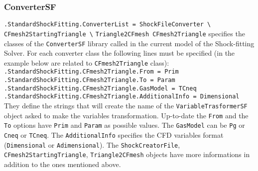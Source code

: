 \documentclass[11pt,a4paper,oneside]{article}
\begin{document}
\subsubsection*{ConverterSF}

\hspace*{1cm} \texttt{.StandardShockFitting.ConverterList = ShockFileConverter \textbackslash{}}
\newline
\hspace*{8.6cm} \texttt{CFmesh2StartingTriangle \textbackslash{}}
\newline
\hspace*{8.6cm} \texttt{Triangle2CFmesh CFmesh2Triangle}
\newline
\newline
specifies the classes of the \texttt{ConverterSF} library called in the current model of the Shock-fitting Solver. For each converter class the following lines must be specified (in the example below are related to \texttt{CFmesh2Triangle} class):
\newline
\newline
\hspace*{1cm} \texttt{.StandardShockFitting.CFmesh2Triangle.From = Prim}
\newline
\hspace*{1cm} \texttt{.StandardShockFitting.CFmesh2Triangle.To = Param}
\newline
\hspace*{1cm} \texttt{.StandardShockFitting.CFmesh2Triangle.GasModel = TCneq}
\newline
\hspace*{1cm} \texttt{.StandardShockFitting.CFmesh2Triangle.AdditionalInfo = Dimensional}
\newline
\newline
They define the strings that will create the name of the \texttt{VariableTrasformerSF} object asked to make the variables transformation. 
\newline
\newline
Up-to-date the \texttt{From} and the \texttt{To} options have \texttt{Prim} and \texttt{Param} as possible values. 
\newline
The \texttt{GasModel} can be \texttt{Pg} or \texttt{Cneq} or \texttt{TCneq}. 
\newline
The \texttt{AdditionalInfo} specifies the CFD variables format (\texttt{Dimensional} or \texttt{Adimensional}).
\newline
\newline
The \texttt{ShockCreatorFile}, \texttt{CFmesh2StartingTriangle}, \texttt{Triangle2CFmesh} objects have more informations in addition to the ones mentioned above.
\end{document}
